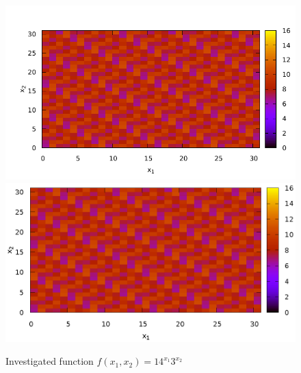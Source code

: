 \begin{figure}
\centering

\ifpdf
\includegraphics[angle=0]
{./discretlog/picdiscretlog0.pdf}
\else
\includegraphics[angle=0]
{./discretlog/picdiscretlog0.eps}
\fi
%

\caption{Investigated function $f(x_1, x_2) = 14^{x_1}3^{x_2}$} 
\label{fig:dl0}
\end{figure}
